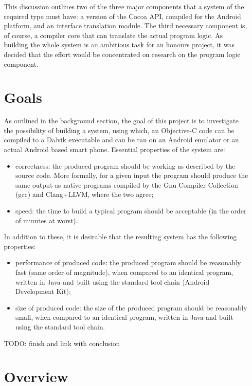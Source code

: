 \documentclass[parskip]{cs4rep}
\begin{document}
This discussion outlines two of the three major components that a system of the required type must have: a version of the Cocoa API, compiled for the Android platform, and an interface translation module. The third necessary component is, of course, a compiler core that can translate the actual program logic. As building the whole system is an ambitious task for an honours project, it was decided that the effort would be concentrated on research on the program logic component.

\section{Goals}

As outlined in the background section, the goal of this project is to investigate the possibility of building a system, using which, an Objective-C code can be compiled to a Dalvik executable and can be ran on an Android emulator or an actual Android based smart phone. Essential properties of the system are:
\begin{itemize}
\item
correctness: the produced program should be working as described by the source code. More formally, for a given input the program should produce the same output as native programs compiled by the Gnu Compiler Collection (gcc) and Clang+LLVM, where the two agree;
\item
speed: the time to build a typical program should be acceptable (in the order of minutes at worst).
\end{itemize}

In addition to these, it is desirable that the resulting system has the following properties:

\begin{itemize}
\item
performance of produced code: the produced program should be reasonably fast (same order of magnitude), when compared to an identical program, written in Java and built using the standard tool chain (Android Development Kit);
\item
size of produced code: the size of the produced program should be reasonably small, when compared to an identical program, written in Java and built using the standard tool chain.
\end{itemize}

TODO: finish and link with conclusion

\section{Overview}
\end{document}

